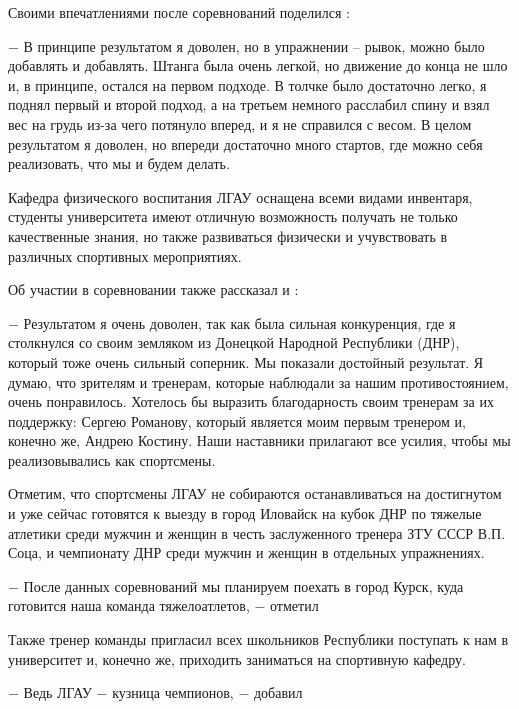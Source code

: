 Своими впечатлениями после соревнований поделился : 

\begin{zzquote}
−  В принципе результатом я доволен, но в упражнении – рывок, можно было
добавлять и добавлять. Штанга была очень легкой, но движение до конца не шло и,
в принципе, остался на первом подходе. В толчке было достаточно легко, я поднял
первый и второй подход, а на третьем немного расслабил спину и взял вес на
грудь из-за чего потянуло вперед, и я не справился с весом. В целом результатом
я доволен, но впереди достаточно много стартов, где можно себя реализовать, что
мы и будем делать.
\end{zzquote}


Кафедра физического воспитания ЛГАУ оснащена всеми видами инвентаря, студенты
университета имеют отличную возможность получать не только качественные знания,
но также развиваться физически и учувствовать в различных спортивных
мероприятиях.

Об участии в соревновании также рассказал и :

\begin{zzquote}
− Результатом я очень доволен, так как была сильная конкуренция, где я
столкнулся со своим земляком из Донецкой Народной Республики (ДНР), который
тоже очень сильный соперник. Мы показали достойный результат. Я думаю, что
зрителям и тренерам, которые наблюдали за нашим противостоянием, очень
понравилось. Хотелось бы выразить благодарность своим тренерам за их поддержку:
Сергею Романову, который является моим первым тренером и, конечно же, Андрею
Костину. Наши наставники прилагают все усилия, чтобы мы реализовывались как
спортсмены.  	
\end{zzquote}

Отметим, что спортсмены ЛГАУ не собираются останавливаться на достигнутом и уже
сейчас готовятся к выезду в город Иловайск на кубок ДНР по тяжелые атлетики
среди мужчин и женщин в честь заслуженного тренера ЗТУ СССР В.П. Соца, и
чемпионату ДНР среди мужчин и женщин в отдельных упражнениях.

\begin{zzquote} 
− После данных соревнований мы планируем поехать в город Курск,
куда готовится наша команда тяжелоатлетов, − отметил 	
\end{zzquote}

Также тренер команды пригласил всех школьников Республики поступать к нам в
университет и, конечно же, приходить заниматься на спортивную кафедру.

\begin{zzquote} 
− Ведь ЛГАУ − кузница чемпионов, − добавил 
\end{zzquote}


